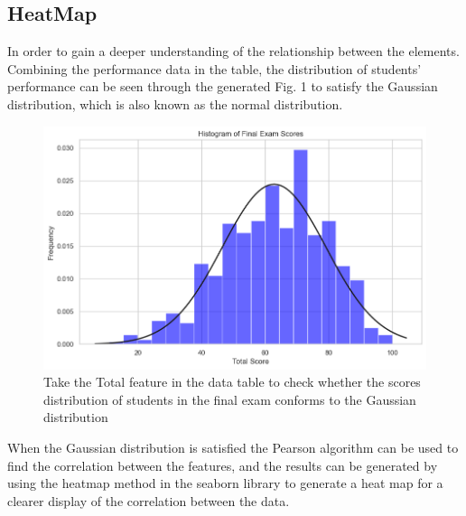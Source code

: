 \documentclass[twocolumn]{IEEEtran}
\begin{document}
\subsection{HeatMap}
In order to gain a deeper understanding of the relationship between the elements. Combining the performance data in the table, the distribution of students' performance can be seen through the generated Fig. 1 to satisfy the Gaussian distribution, which is also known as the normal distribution. 
\begin{figure}[H]
    \centering %
    \includegraphics[scale=0.3]{./img/Gaussian.png}
    \caption{Take the Total feature in the data table to check whether the scores distribution of students in the final exam conforms to the Gaussian distribution}
\end{figure}
\vspace{-0.2cm}
When the Gaussian distribution is satisfied the Pearson algorithm can be used to find the correlation between the features, and the results can be generated by using the heatmap method in the seaborn library to generate a heat map for a clearer display of the correlation between the data. 
\vspace{-0.2cm}
\end{document}
